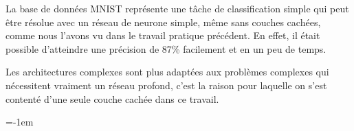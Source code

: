 \documentclass[a4paper,english,12pt]{article}
\makeatletter
\newcommand{\emptypage}[1]{
  \cleardoublepage
  \begingroup
  \let\ps@plain\ps@empty
  \pagestyle{empty}
  #1
  \cleardoublepage
  \endgroup}
\makeatother
\begin{document}
La base de données MNIST représente une tâche de classification simple qui peut être résolue avec un réseau de neurone simple, même sans couches cachées, comme nous l'avons vu dans le travail pratique précédent. En effet, il était possible d'atteindre une précision de 87\% facilement et en un peu de temps.

Les architectures complexes sont plus adaptées aux problèmes complexes qui nécessitent vraiment un réseau profond, c'est la raison pour laquelle on s'est contenté d'une seule couche cachée dans ce travail.

\parskip=-1em
\let\section\oldsection %
%
\end{document}

